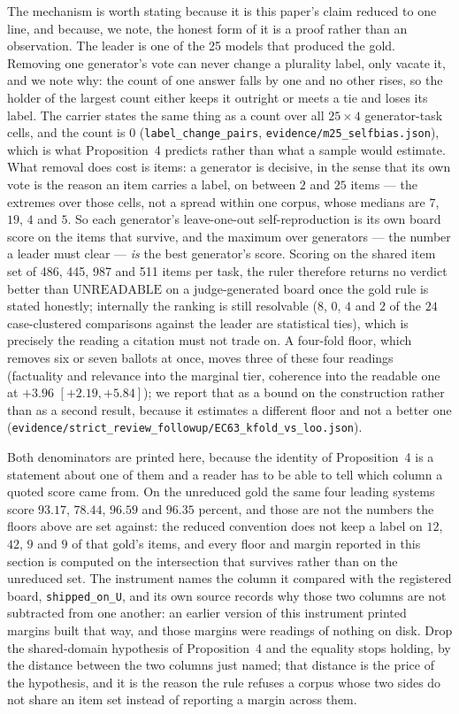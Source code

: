 \documentclass{article}
\newcommand{\ids}[1]{\texttt{\small #1}} %
\begin{document}
The mechanism is worth stating because it is this paper's claim reduced to one line, and because, we note,
the honest form of it is a proof rather than an observation. The leader is one of the 25 models that produced the gold.
Removing one generator's vote can never change a plurality label, only vacate it, and we note why: the count of one answer
falls by one and no other rises, so the holder of the largest count either keeps it outright or meets a tie
and loses its label. The carrier states the same thing as a count over all $25\times4$ generator-task cells,
and the count is $0$ (\texttt{label\_change\_pairs}, \ids{evidence/m25\_selfbias.json}), which is what
Proposition~4 predicts rather than what a sample would estimate. What removal does cost is items: a generator
is decisive, in the sense that its own vote is the reason an item carries a label, on between $2$ and $25$
items --- the extremes over those cells, not a spread within one corpus, whose medians are $7$, $19$, $4$ and
$5$. So each generator's leave-one-out self-reproduction is its own board score on the items that survive,
and the maximum over generators --- the number a leader must clear --- \emph{is} the best generator's score.
Scoring on the shared item set of 486, 445, 987 and 511 items per task, the ruler therefore returns no verdict
better than $\mathrm{UNREADABLE}$ on a judge-generated board once the gold rule is stated honestly; internally
the ranking is still resolvable ($8$, $0$, $4$ and $2$ of the $24$ case-clustered comparisons against the leader
are statistical ties), which is precisely the reading a citation must not trade on. A four-fold floor, which removes six or seven ballots at once, moves three of these four readings (factuality and relevance into the marginal tier, coherence into the readable one at $+3.96$ $[+2.19,+5.84]$); we report that as a bound on the construction rather than as a second result, because it estimates a different floor and not a better one (\ids{evidence/strict\_review\_followup/EC63\_kfold\_vs\_loo.json}).

Both denominators are printed here, because the identity of Proposition~4 is a statement about one of them and a reader has to be able to tell which column a quoted score came from. On the unreduced gold the same four leading systems score $93.17$, $78.44$, $96.59$ and $96.35$
percent, and those are not the numbers the floors above are set against: the reduced convention does not keep a label on $12$, $42$, $9$ and
$9$ of that gold's items, and every floor and margin reported in this section is computed on the intersection that survives rather than on
the unreduced set. The instrument names the column it compared with the registered board, \texttt{shipped\_on\_U}, and its own source records
why those two columns are not subtracted from one another: an earlier version of this instrument printed margins built that way, and those
margins were readings of nothing on disk. Drop the shared-domain hypothesis of Proposition~4 and the equality stops holding, by the distance
between the two columns just named; that distance is the price of the hypothesis, and it is the reason the rule refuses a corpus whose two
sides do not share an item set instead of reporting a margin across them.
\end{document}
